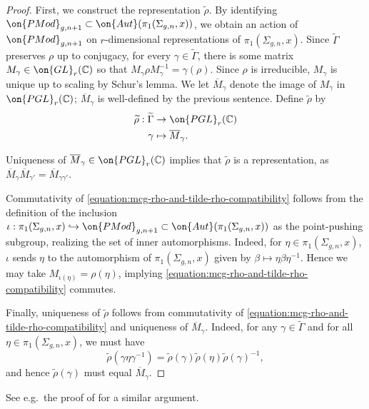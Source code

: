 \documentclass[12 pt]{amsart}
\theoremstyle{plain}
\theoremstyle{definition}
\theoremstyle{remark}
\numberwithin{equation}{section}
\begin{document}
\begin{proof}
	First, we construct the representation $\widetilde{\rho}$. 
	By identifying 
	$\on{PMod}_{g,n+1} \subset \on{Aut}(\pi_1(\Sigma_{g,n},x))$, 
	we obtain an action of 
	$\on{PMod}_{g,n+1}$ on $r$-dimensional representations of 
	$\pi_1(\Sigma_{g,n},x)$.
	Since $\widetilde{\Gamma}$ preserves $\rho$ up to
	conjugacy, for every $\gamma \in \widetilde{\Gamma}$, there is some matrix $M_\gamma \in \on{GL}_r(\mathbb C)$
	so that $M_\gamma \rho M_\gamma^{-1} = \gamma(\rho)$.
	Since $\rho$ is irreducible, $M_\gamma$ is unique up to scaling by
	Schur's lemma.
We let $\overline{M}_\gamma$ denote the image of $M_\gamma$ in
	$\on{PGL}_r(\mathbb C)$; $\overline{M}_\gamma$ is well-defined by the previous sentence.
	Define $\widetilde{\rho}$ by  
	\begin{align*}
		\widetilde{\rho}:  \widetilde{\Gamma} &\rightarrow \on{PGL}_r(\mathbb C) \\
		\gamma &\mapsto \overline{M}_\gamma.
	\end{align*}

	Uniqueness of 
	$\overline{M}_\gamma \in \on{PGL}_r(\mathbb C)$
	implies that $\widetilde{\rho}$ is a representation, as $\overline{M}_\gamma\overline{M}_{\gamma'}=\overline{M}_{\gamma\gamma'}$. 

	Commutativity of 	
	\eqref{equation:mcg-rho-and-tilde-rho-compatibility}
	follows from the definition of the inclusion $\iota: \pi_1(\Sigma_{g,n}, x) \hookrightarrow
	\on{PMod}_{g,n+1}\subset \on{Aut}(\pi_1(\Sigma_{g,n}, x))$ as the
	point-pushing subgroup, realizing the set of inner automorphisms.
  Indeed, for $\eta\in \pi_1(\Sigma_{g,n}, x)$, $\iota$ sends
	$\eta$ to the automorphism of $\pi_1(\Sigma_{g,n}, x)$ given by $\beta\mapsto \eta \beta
	\eta^{-1}.$
	Hence we may take $M_{\iota(\eta)}=\rho(\eta)$, implying 
	\eqref{equation:mcg-rho-and-tilde-rho-compatibility} commutes.
	
	Finally, uniqueness of $\widetilde{\rho}$ follows from commutativity of \eqref{equation:mcg-rho-and-tilde-rho-compatibility} and uniqueness of $\overline{M}_\gamma$. Indeed, for any $\gamma\in \widetilde{\Gamma}$ and for all $\eta\in \pi_1(\Sigma_{g,n}, x)$, we must have $$\widetilde{\rho}(\gamma\eta\gamma^{-1})=\widetilde{\rho}(\gamma)\widetilde{\rho}(\eta)\widetilde{\rho}(\gamma)^{-1},$$ and hence $\widetilde{\rho}(\gamma)$ must equal $\overline{M}_\gamma$.
\end{proof}
See e.g.~the proof of \cite[Theorem 4]{simpson1992higgs} for a similar argument.
\end{document}
